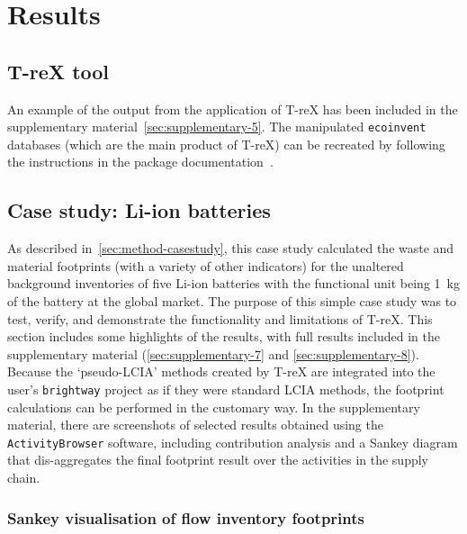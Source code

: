 \documentclass[a4paper,fleqn]{cas-dc}
\begin{document}
	
	
	\section{Results}\label{sec:results}
	\subsection{T-reX tool}\label{sec:results-T-reX}
	
	An example of the output from the application of T-reX has been included in the
	supplementary material~\autoref{sec:supplementary-5}. The
	manipulated \texttt{ecoinvent} databases (which are the main product of T-reX)
	can be recreated by following the instructions in the package
	documentation~\citep{mcdowall2023T-reXdocs}.
	
	\subsection{Case study: Li-ion batteries}\label{sec:results-casestudy}
	
	As described in~\autoref{sec:method-casestudy}, this case study calculated the
	waste and material footprints (with a variety of other indicators) for the
	unaltered background inventories of five Li-ion batteries with the functional
	unit being 1~kg of the battery at the global market. The purpose of this simple
	case study was to test, verify, and demonstrate the functionality and
	limitations of T-reX. This section includes some highlights of the results,
	with full results included in the supplementary material
	(\autoref{sec:supplementary-7} and \autoref{sec:supplementary-8}). Because the `pseudo-LCIA' methods created by
	T-reX are integrated into the user's \texttt{brightway} project as if they were
	standard LCIA methods, the footprint calculations can be performed in the
	customary way. In the supplementary material, there are screenshots of selected
	results obtained using the \texttt{ActivityBrowser} software, including
	contribution analysis and a Sankey diagram that dis-aggregates the final
	footprint result over the activities in the supply chain.
	
	\subsubsection{Sankey visualisation of flow inventory footprints}\label{sec:results-case_study-sankey}
	
\end{document}
